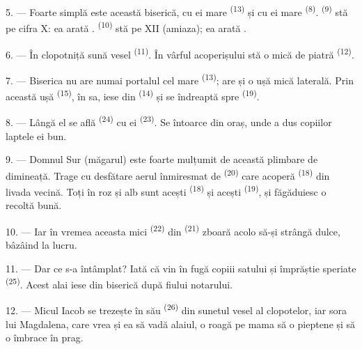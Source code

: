 \VUsaut{3.4mm}
\VUsaut{3.0mm}

5. --- Foarte simplă este această biserică, cu  ei mare
\textsuperscript{(13)} și cu  ei mare \textsuperscript{(8)}.
 \textsuperscript{(9)} stă pe cifra X: ea arată
.  \textsuperscript{(10)} stă pe XII (amiaza); ea
arată .

6. --- În clopotniță sună vesel  \textsuperscript{(11)}. În
vârful acoperișului stă o  mică de piatră \textsuperscript{(12)}.

7. --- Biserica nu are numai portalul cel mare \textsuperscript{(13)}; are și o
ușă mică laterală. Prin această ușă  \textsuperscript{(15)}, în
 sa, iese din  \textsuperscript{(14)} și se
îndreaptă spre  \textsuperscript{(19)}.

8. --- Lângă el se află  \textsuperscript{(24)} cu
 ei \textsuperscript{(23)}. Se întoarce din oraș, unde a dus
copiilor laptele ei bun.

\VUsaut{4.0mm}
\VUsaut{3.4mm}

9. --- Domnul Sur (măgarul) este foarte mulțumit de această plimbare de dimineață.
Trage cu desfătare aerul înmiresmat de  \textsuperscript{(20)}
care acoperă  \textsuperscript{(18)} din livada vecină. Toți în roz
și alb sunt acești  \textsuperscript{(18)} și acești
 \textsuperscript{(19)}, și făgăduiesc o recoltă bună.

10. --- Iar în vremea aceasta  mici \textsuperscript{(22)} din
 \textsuperscript{(21)} zboară acolo să-și strângă 
dulce, bâzâind la lucru.

11. --- Dar ce s-a întâmplat? Iată că vin în fugă copiii satului și împrăștie
 speriate \textsuperscript{(25)}. Acest alai iese din biserică
după  fiului notarului.

12. --- Micul Iacob se trezește în  său \textsuperscript{(26)}
din sunetul vesel al clopotelor, iar sora lui Magdalena, care vrea și ea să vadă
alaiul, o roagă pe mama să o pieptene și să o îmbrace în prag.

